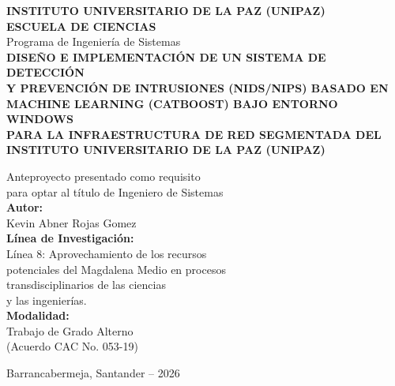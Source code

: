 \documentclass[12pt, letterpaper, oneside]{report}
\begin{document}
\clearpage
\thispagestyle{empty}
\begin{center}
  \vspace*{1cm}
  {\large \textbf{INSTITUTO UNIVERSITARIO DE LA PAZ (UNIPAZ)}}\\[0.5cm]
  {\large \textbf{ESCUELA DE CIENCIAS}}\\
  {\normalsize Programa de Ingeniería de Sistemas}\\[2cm]

  {\Large \textbf{\color{unipazblue}
    DISEÑO E IMPLEMENTACIÓN DE UN SISTEMA DE DETECCIÓN\\[0.3cm]
    Y PREVENCIÓN DE INTRUSIONES (NIDS/NIPS) BASADO EN\\[0.3cm]
    MACHINE LEARNING (CATBOOST) BAJO ENTORNO WINDOWS\\[0.3cm]
    PARA LA INFRAESTRUCTURA DE RED SEGMENTADA DEL\\[0.3cm]
    INSTITUTO UNIVERSITARIO DE LA PAZ (UNIPAZ)
  }}\\[2cm]

  \begin{flushleft}
    \hspace{8cm}
    \begin{minipage}{0.45\textwidth}
      Anteproyecto presentado como requisito\\
      para optar al título de Ingeniero de Sistemas\\[1cm]
      \textbf{Autor:}\\
      Kevin Abner Rojas Gomez\\[0.8cm]
      \textbf{Línea de Investigación:}\\
      Línea 8: Aprovechamiento de los recursos\\
      potenciales del Magdalena Medio en procesos\\
      transdisciplinarios de las ciencias\\
      y las ingenierías.\\[0.8cm]
      \textbf{Modalidad:}\\
      Trabajo de Grado Alterno\\
      (Acuerdo CAC No. 053-19)
    \end{minipage}
  \end{flushleft}
  \vfill
  {\normalsize Barrancabermeja, Santander -- 2026}
\end{center}
\clearpage
\end{document}
